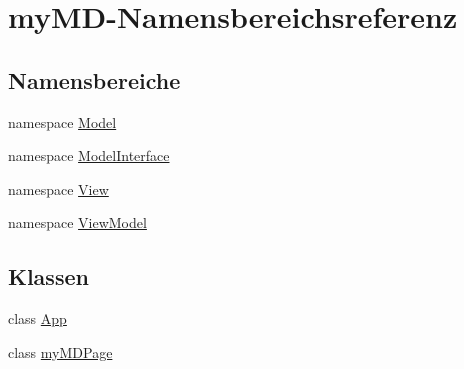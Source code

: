 \hypertarget{namespacemy_m_d}{}\section{my\+M\+D-\/\+Namensbereichsreferenz}
\label{namespacemy_m_d}
\subsection*{Namensbereiche}
\begin{DoxyCompactItemize}
\item 
namespace \mbox{\hyperlink{namespacemy_m_d_1_1_model}{Model}}
\item 
namespace \mbox{\hyperlink{namespacemy_m_d_1_1_model_interface}{Model\+Interface}}
\item 
namespace \mbox{\hyperlink{namespacemy_m_d_1_1_view}{View}}
\item 
namespace \mbox{\hyperlink{namespacemy_m_d_1_1_view_model}{View\+Model}}
\end{DoxyCompactItemize}
\subsection*{Klassen}
\begin{DoxyCompactItemize}
\item 
class \mbox{\hyperlink{classmy_m_d_1_1_app}{App}}
\item 
class \mbox{\hyperlink{classmy_m_d_1_1my_m_d_page}{my\+M\+D\+Page}}
\end{DoxyCompactItemize}
